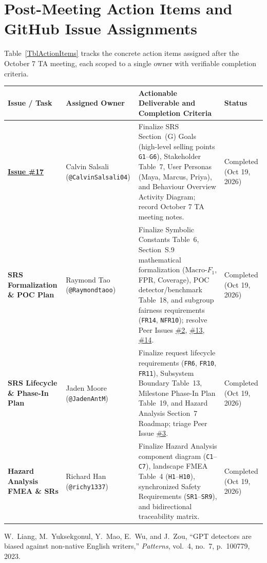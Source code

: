 \documentclass[11pt]{article}
\begin{document}
\section{Post-Meeting Action Items and GitHub Issue Assignments}

Table~\ref{TblActionItems} tracks the concrete action items assigned after the October 7 TA meeting, each scoped to a single owner with verifiable completion criteria.

\begin{tabularx}{\textwidth}{P{1.6cm} P{3.2cm} Y P{2.2cm}}
\caption{Post-Meeting Action Items and Single-Owner Assignments} \label{TblActionItems}\\
\toprule
\textbf{Issue / Task} & \textbf{Assigned Owner} & \textbf{Actionable Deliverable and Completion Criteria} & \textbf{Status}\\
\midrule
\href{https://github.com/richy1337/Verity/issues/17}{\textbf{Issue \#17}} & Calvin Salsali (\texttt{@CalvinSalsali04}) & Finalize SRS Section~(G) Goals (high-level selling points \texttt{G1}--\texttt{G6}), Stakeholder Table~7, User Personas (Maya, Marcus, Priya), and Behaviour Overview Activity Diagram; record October 7 TA meeting notes. & Completed (Oct 19, 2026)\\
\addlinespace
\textbf{SRS Formalization \& POC Plan} & Raymond Tao (\texttt{@Raymondtaoo}) & Finalize Symbolic Constants Table~6, Section~S.9 mathematical formalization ($\text{Macro-}F_1$, FPR, Coverage), POC detector/benchmark Table~18, and subgroup fairness requirements (\texttt{FR14}, \texttt{NFR10}); resolve Peer Issues \href{https://github.com/richy1337/Verity/issues/2}{\#2}, \href{https://github.com/richy1337/Verity/issues/13}{\#13}, \href{https://github.com/richy1337/Verity/issues/14}{\#14}. & Completed (Oct 19, 2026)\\
\addlinespace
\textbf{SRS Lifecycle \& Phase-In Plan} & Jaden Moore (\texttt{@JadenAntM}) & Finalize request lifecycle requirements (\texttt{FR6}, \texttt{FR10}, \texttt{FR11}), Subsystem Boundary Table~13, Milestone Phase-In Plan Table~19, and Hazard Analysis Section~7 Roadmap; triage Peer Issue \href{https://github.com/richy1337/Verity/issues/3}{\#3}. & Completed (Oct 19, 2026)\\
\addlinespace
\textbf{Hazard Analysis FMEA \& SRs} & Richard Han (\texttt{@richy1337}) & Finalize Hazard Analysis component diagram (\texttt{C1}--\texttt{C7}), landscape FMEA Table~4 (\texttt{H1}--\texttt{H10}), synchronized Safety Requirements (\texttt{SR1}--\texttt{SR9}), and bidirectional traceability matrix. & Completed (Oct 19, 2026)\\
\bottomrule
\end{tabularx}

\begin{thebibliography}{9}
W.~Liang, M.~Yuksekgonul, Y.~Mao, E.~Wu, and J.~Zou, ``GPT detectors are biased against non-native English writers,'' \emph{Patterns}, vol.~4, no.~7, p.~100779, 2023.
\end{thebibliography}
\end{document}
